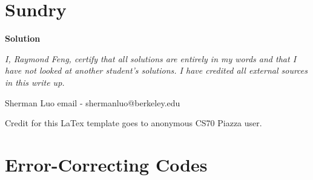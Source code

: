 \documentclass[11pt]{article}
\newcommand*{\Question}[1]{\section{#1}}
\begin{document}
\Question{Sundry} 
\vspace{10pt}
\begin{mdframed} \textbf{Solution} 
\item \textit {I, Raymond Feng, certify that all solutions are entirely in my words and that I have not looked at another student's solutions. I have credited all external sources in this write up.}
\item Sherman Luo email - shermanluo@berkeley.edu
\item Credit for this LaTex template goes to anonymous CS70 Piazza user.
\end{mdframed}
\vfill\pagebreak[3]

\Question{Error-Correcting Codes}
\end{document}
